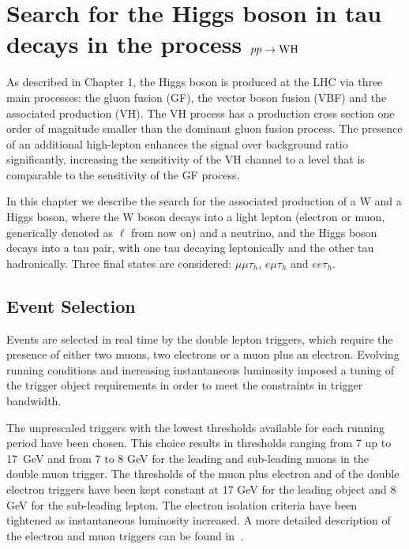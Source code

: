 \chapter[$pp\rightarrow\W\rm{H}$]{Search for the Higgs boson in tau decays in the process $pp\rightarrow\W\rm{H}$}%

As described in Chapter 1, the Higgs boson is produced at the LHC via three main processes: the gluon fusion (GF), the vector boson fusion (VBF) and the associated production (VH). The VH process has a production cross section one order of magnitude smaller than the dominant gluon fusion process. The presence of an additional high-\pT lepton enhances the signal over background ratio significantly,  increasing the sensitivity of the VH channel to a level that is comparable to the sensitivity of the GF process. 

In this chapter we describe the search for the associated production of a W and a Higgs boson, where the W boson decays into a light lepton (electron or muon, generically denoted as $\ell$ from now on) and a neutrino, and the Higgs boson decays into a tau pair, with one tau decaying leptonically and the other tau hadronically. Three final states are considered: $\mu\mu\tau_h$, $e\mu\tau_h$ and $ee\tau_h$. 

\section{Event Selection}

Events are selected in real time by the double lepton triggers, which require the presence of either two muons, two electrons or a muon plus an electron. Evolving running conditions and increasing instantaneous luminosity imposed a tuning of the trigger object requirements in order to meet the constraints in trigger bandwidth. %

The unprescaled triggers with the lowest \pT thresholds available for each running period have been chosen. This choice results in \pT thresholds ranging from 7 up to 17~GeV and from 7 to 8 GeV for the leading and sub-leading muons in the double muon trigger. The \pT thresholds of the muon plus electron and of the double electron triggers have been kept constant at 17 GeV for the leading object and 8 GeV for the sub-leading lepton. The electron isolation criteria have been tightened as instantaneous luminosity increased. %
A more detailed description of the electron and muon triggers can be found in~\cite{Chatrchyan:2012xi,CMS-PAS-EGM-10-004}.

